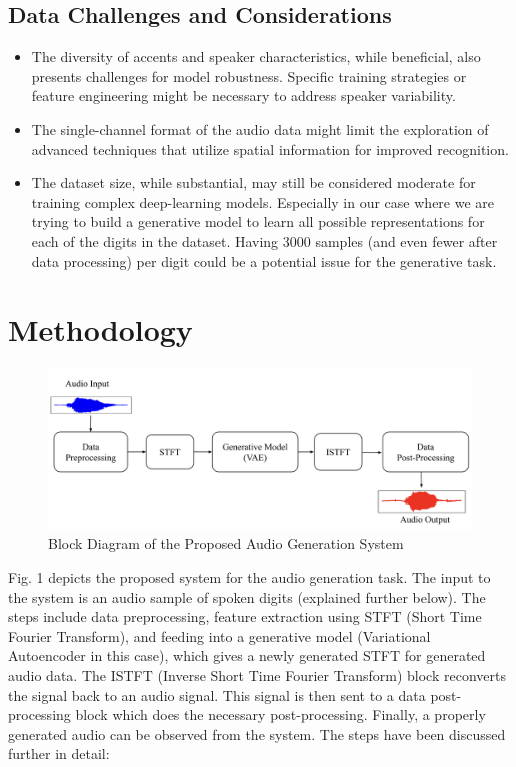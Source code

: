 \documentclass[12pt]{article}
\begin{document}
\subsection{Data Challenges and Considerations}
\begin{itemize}
    \item The diversity of accents and speaker characteristics, while beneficial, also presents challenges for model robustness. Specific training strategies or feature engineering might be necessary to address speaker variability.
    \item The single-channel format of the audio data might limit the exploration of advanced techniques that utilize spatial information for improved recognition.
    \item The dataset size, while substantial, may still be considered moderate for training complex deep-learning models. Especially in our case where we are trying to build a generative model to learn all possible representations for each of the digits in the dataset.  Having 3000 samples (and even fewer after data processing) per digit could be a potential issue for the generative task.
\end{itemize}





\section{Methodology}

\begin{figure}[h!]
    \centering
    \includegraphics[width=0.9\linewidth]{figures/method.png}
    \caption{Block Diagram of the Proposed Audio Generation System}
    \label{fig:enter-label}
\end{figure}


Fig. 1 depicts the proposed system for the audio generation task. The input to the system is an audio sample of spoken digits (explained further below). The steps include data preprocessing, feature extraction using STFT (Short Time Fourier Transform), and feeding into a generative model (Variational Autoencoder in this case), which gives a newly generated STFT for generated audio data. The ISTFT (Inverse Short Time Fourier Transform) block reconverts the signal back to an audio signal. This signal is then sent to a data post-processing block which does the necessary post-processing. Finally, a properly generated audio can be observed from the system. The steps have been discussed further in detail:
\end{document}
